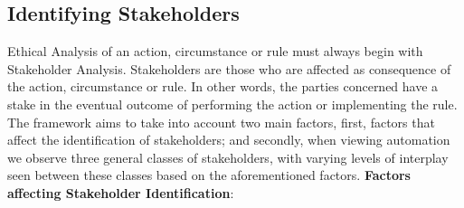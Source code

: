 \subsection{Identifying Stakeholders}
\label{sec:-identify}
Ethical Analysis of an action, circumstance or rule must always begin with Stakeholder Analysis. Stakeholders are those who are affected as consequence of the action, circumstance or rule. In other words, the parties concerned have a stake in the eventual outcome of performing the action or implementing the rule.\\
The framework aims to take into account two main factors, first, factors that affect the identification of stakeholders; and secondly, when viewing automation we observe three general classes of stakeholders, with varying levels of interplay seen between these classes based on the aforementioned factors.
\textbf{Factors affecting Stakeholder Identification}:\\

